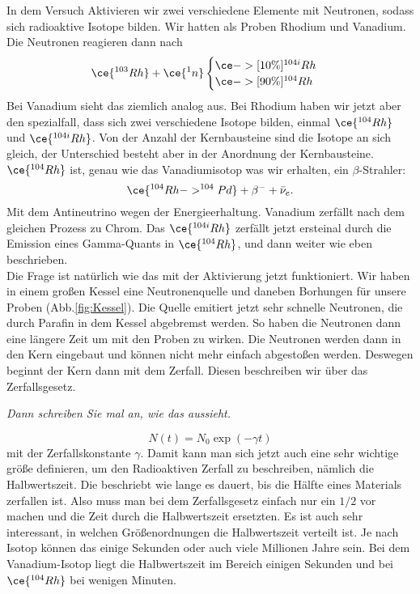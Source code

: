 In dem Versuch Aktivieren wir zwei verschiedene Elemente mit Neutronen, sodass sich radioaktive Isotope bilden. Wir hatten als Proben 
Rhodium und Vanadium. Die Neutronen reagieren dann nach 
\begin{equation}
        \ce{^{103}Rh}+\ce{^{1}n}
        \begin{cases}
            \ce{->[10\%]^{104 i}Rh}\\
            \ce{->[90\%]^{104}Rh}
        \end{cases}
\end{equation}
Bei Vanadium sieht das ziemlich analog aus. Bei Rhodium haben wir jetzt aber den spezialfall, dass sich zwei verschiedene Isotope bilden, 
einmal $\ce{^{104}Rh}$ und $\ce{^{104i}Rh}$. Von der Anzahl der Kernbausteine sind die Isotope an sich gleich, der Unterschied besteht 
aber in der Anordnung der Kernbausteine. $\ce{^{104}Rh}$ ist, genau wie das Vanadiumisotop was wir erhalten, ein $\beta$-Strahler: 
\begin{equation}
    \ce{^{104}Rh -> ^{104}Pd}+\beta^-+\bar{\nu}_e. 
\end{equation}
Mit dem Antineutrino wegen der Energieerhaltung. Vanadium zerfällt nach dem gleichen Prozess zu Chrom. 
Das $\ce{^{104i}Rh}$ zerfällt jetzt ersteinal durch die Emission eines Gamma-Quants in $\ce{^{104}Rh}$, und dann weiter wie eben beschrieben. 
\\
Die Frage ist natürlich wie das mit der Aktivierung jetzt funktioniert. Wir haben in einem großen Kessel eine Neutronenquelle und daneben
Borhungen für unsere Proben (Abb.\ref{fig:Kessel}). Die Quelle emitiert jetzt sehr schnelle Neutronen, die durch Parafin in dem Kessel abgebremst
werden. So haben die Neutronen dann eine längere Zeit um mit den Proben zu wirken. Die Neutronen werden dann in den Kern eingebaut und können
nicht mehr einfach abgestoßen werden. Deswegen beginnt der Kern dann mit dem Zerfall. Diesen beschreiben wir über das Zerfallsgesetz. 

\textit{Dann schreiben Sie mal an, wie das aussieht.}

\begin{equation}
    N(t)=N_0\exp(-\gamma t)
\end{equation}
mit der Zerfallskonstante $\gamma$.
Damit kann man sich jetzt auch eine sehr wichtige größe definieren, um den Radioaktiven Zerfall zu beschreiben, nämlich die Halbwertszeit. Die
beschriebt wie lange es dauert, bis die Hälfte eines Materials zerfallen ist. Also muss man bei dem Zerfallsgesetz einfach nur ein $1/2$ vor 
machen und die Zeit durch die Halbwertszeit ersetzten. Es ist auch sehr interessant, in welchen Größenordnungen die Halbwertszeit verteilt ist.
Je nach Isotop können das einige Sekunden oder auch viele Millionen Jahre sein. Bei dem Vanadium-Isotop liegt die Halbwertszeit im Bereich 
einigen Sekunden und bei $\ce{^{104}Rh}$ bei wenigen Minuten.


